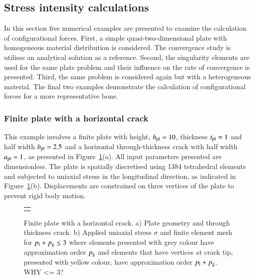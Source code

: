 \documentclass[review]{elsarticle}
\numberwithin{equation}{section}
\begin{document}
\subsection{Stress intensity calculations}
\label{sec:release_energy_rate}
In this section five numerical examples are presented to examine the calculation of configurational forces.
First, a simple quasi-two-dimensional plate with homogeneous material distribution is considered.  The convergence study is utilises an analytical solution as a reference.
Second, the singularity elements are used for the same plate problem and their influence on the rate of convergence is presented. 
Third, the same problem is considered again but with a heterogeneous material. 
The final two examples demonstrate the calculation of configurational forces for a more representative bone.
 
\subsubsection{Finite plate with a horizontal crack}\label{sec:plate_section}
This example involves a finite plate with height, $h_{\rm {pl}} = 10$, thickness $t_{\rm {pl}}=1$ and half width $b_{\rm{pl}} = 2.5$ and a horizontal through-thickness crack with half width $a_{\rm {pl}} = 1$, as presented in Figure~\ref{fig:plate_load_mesh}(a). All input parameters presented are dimensionless. 
The  plate is spatially discretised using 1384 tetrahedral elements and subjected to uniaxial stress in the longitudinal direction, as indicated in Figure~\ref{fig:plate_load_mesh}(b). 
Displacements are constrained on three vertices of the plate to prevent rigid body motion. 

\begin{figure}[h!]
\begin{center}
\begin{tabular}{c}
{\def\svgwidth{17cm} }\\
\end{tabular}
\caption{Finite plate with a horizontal crack. a) Plate geometry and through thickness crack. b) Applied uniaxial stress $\sigma$ and finite element mesh for $p_{\rm l} + p_{\rm g} \leq 3$ where elements presented with grey colour have approximation order $p_{\rm g}$ and elements that have vertices at crack tip, presented with yellow colour, have approximation order $p_{\rm l}+p_{\rm g}$.  WHY <= 3?}
\label{fig:plate_load_mesh}
\end{center}
\end{figure}
\end{document}
